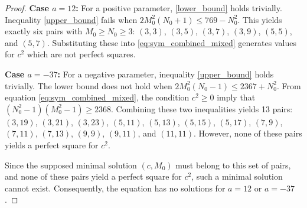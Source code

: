 \documentclass[10pt,a4paper]{amsart}
\begin{document}
\begin{proof}
\textbf{Case $a=12$:} For a positive parameter, \eqref{lower_bound} holds trivially. Inequality \eqref{upper_bound} fails when $2M_0^2(N_0+1) \le 769 - N_0^2$. This yields exactly six pairs with $M_0 \ge N_0 \ge 3$: $(3,3)$, $(3,5)$, $(3,7)$, $(3,9)$, $(5,5)$, and $(5,7)$. Substituting these into \eqref{eq:sym_combined_mixed} generates values for $c^2$ which are not perfect squares.


 \textbf{Case $a=-37$:} For a negative parameter, inequality \eqref{upper_bound} holds trivially. The lower bound does not hold when $2M_0^2(N_0-1) \le 2367 + N_0^2$. From equation \eqref{eq:sym_combined_mixed}, the condition $c^2 \ge 0$ imply that $(N_0^2 - 1) (M_0^2 - 1) \geq 2368$. Combining these two inequalities yields 13 pairs: $(3,19)$, $(3,21)$, $(3,23)$, $(5,11)$, $(5,13)$, $(5,15)$, $(5,17)$, $(7,9)$, $(7,11)$, $(7,13)$, $(9,9)$, $(9,11)$, and $(11,11)$. However, none of these pairs yields a perfect square for $c^2$.

Since the supposed minimal solution $(c, M_0)$ must belong to this set of pairs, and none of these pairs yield a perfect square for $c^2$, such a minimal solution cannot exist. Consequently, the equation has no solutions for $a=12$ or $a=-37$.
\end{proof}
\end{document}
